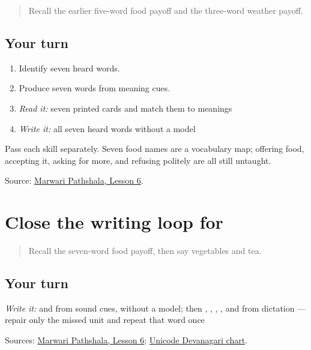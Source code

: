 \label{lesson:MW-C20-food-seven}



\begin{quote}
Recall the earlier five-word food payoff and the three-word weather payoff.
\end{quote}

\subsection*{Your turn}
\begin{enumerate}
\raggedright
  \item Identify seven heard words.
  \item Produce seven words from meaning cues.
  \item \emph{Read it:} seven printed cards and match them to meanings
  \item \emph{Write it:} all seven heard words without a model
\end{enumerate}

Pass each skill separately. Seven food names are a vocabulary map; offering food, accepting it, asking for more, and refusing politely are all still untaught.

\begin{tcolorbox}[breakable,colback=teal!4,colframe=teal!35!black,title={Before you move on}]
Source: \href{https://www.marwaripathshala.com/marwari-lesson-6-english}{Marwari Pathshala, Lesson 6}.
\end{tcolorbox}
\section[Practice]{Close the writing loop for }

\label{lesson:MW-R20-script-close}



\begin{quote}
Recall the seven-word food payoff, then say vegetables and tea.
\end{quote}

\subsection*{Your turn}
\emph{Write it:} \textbf{} and \textbf{} from sound cues, without a model; then \textbf{}, \textbf{}, \textbf{}, \textbf{}, and \textbf{} from dictation — repair only the missed unit and repeat that word once

\begin{tcolorbox}[breakable,colback=teal!4,colframe=teal!35!black,title={Before you move on}]
Sources: \href{https://www.marwaripathshala.com/marwari-lesson-6-english}{Marwari Pathshala, Lesson 6}; \href{https://www.unicode.org/charts/PDF/U0900.pdf}{Unicode Devanagari chart}.
\end{tcolorbox}
